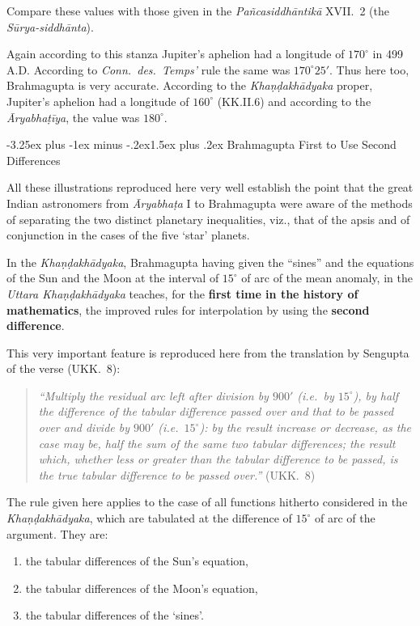 \documentclass[11pt,a4paper]{article}
\makeatletter
\renewcommand{\subsection}{\@startsection{subsection}{2}{\z@}%
  {-3.25ex plus -1ex minus -.2ex}{1.5ex plus .2ex}%
  {\normalfont\large\bfseries\color{sectioncolor}}}
\makeatother
\begin{document}
Compare these values with those given in the \textit{Pañcasiddhāntikā} XVII.~2 (the \textit{Sūrya-siddhānta}).

Again according to this stanza Jupiter's aphelion had a longitude of $170^\circ$ in 499 A.D. According to \textit{Conn.\ des.\ Temps'} rule the same was $170^\circ 25'$. Thus here too, Brahmagupta is very accurate. According to the \textit{Khaṇḍakhādyaka} proper, Jupiter's aphelion had a longitude of $160^\circ$ (KK.II.6) and according to the \textit{Āryabhaṭīya}, the value was $180^\circ$.

\subsection{Brahmagupta First to Use Second Differences}

All these illustrations reproduced here very well establish the point that the great Indian astronomers from \textit{Āryabhaṭa} I to Brahmagupta were aware of the methods of separating the two distinct planetary inequalities, viz., that of the apsis and of conjunction in the cases of the five `star' planets.

In the \textit{Khaṇḍakhādyaka}, Brahmagupta having given the ``sines'' and the equations of the Sun and the Moon at the interval of $15^\circ$ of arc of the mean anomaly, in the \textit{Uttara Khaṇḍakhādyaka} teaches, for the \textbf{first time in the history of mathematics}, the improved rules for interpolation by using the \textbf{second difference}.

This very important feature is reproduced here from the translation by Sengupta of the verse (UKK.~8):

\begin{quote}
\textit{``Multiply the residual arc left after division by $900'$ (i.e.\ by $15^\circ$), by half the difference of the tabular difference passed over and that to be passed over and divide by $900'$ (i.e.\ $15^\circ$): by the result increase or decrease, as the case may be, half the sum of the same two tabular differences; the result which, whether less or greater than the tabular difference to be passed, is the true tabular difference to be passed over.''} (UKK.~8)
\end{quote}

The rule given here applies to the case of all functions hitherto considered in the \textit{Khaṇḍakhādyaka}, which are tabulated at the difference of $15^\circ$ of arc of the argument. They are:
\begin{enumerate}[label=(\roman*)]
\item the tabular differences of the Sun's equation,
\item the tabular differences of the Moon's equation,
\item the tabular differences of the `sines'.
\end{enumerate}
\end{document}
